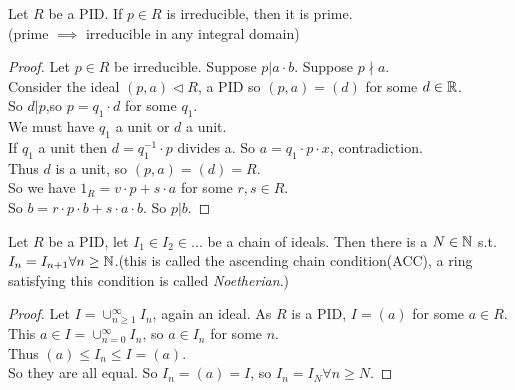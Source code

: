 \documentclass[a4paper]{article}
\begin{document}
\begin{lemma}
Let $R$ be a PID. If $p\in R$ is irreducible, then it is prime.\\
(prime $\implies$ irreducible in any integral domain)
\begin{proof}
Let $p\in R$ be irreducible. Suppose $p|a\cdot b$. Suppose $p \nmid a$.\\
Consider the ideal $\left(p,a\right)\triangleleft R$, a PID so $\left(p,a\right)=\left(d\right)$ for some $d\in \mathbb{R}$.\\
So $d|p$,so $p=q_{1}\cdot d$ for some $q_{1}$.\\
We must have $q_{1}$ a unit or $d$ a unit.\\
If $q_{1}$ a unit then $d=q_{1}^{-1}\cdot p$ divides a. So $a=q_{1}\cdot p\cdot x$, contradiction.\\
Thus $d$ is a unit, so $\left(p,a\right)=\left(d\right)=R$.\\
So we have $1_{R}=v\cdot p+s\cdot a$ for some $r,s \in R$.\\
So $b=r\cdot p\cdot b + s\cdot a\cdot b$. So $p|b$.
\end{proof}
\end{lemma}

\begin{lemma}
Let $R$ be a PID, let $I_{1}\in I_{2}\in...$ be a chain of ideals. Then there is a $N\in\mathbb{N}$ s.t. $I_{n}=I_{n+1} \forall n\geq \mathbb{N}$.(this is called the ascending chain condition(ACC), a ring satisfying this condition is called \emph{Noetherian}.)
\begin{proof}
Let $I=\cup_{n\geq 1}^\infty I_{n}$, again an ideal. As $R$ is a PID, $I=\left(a\right)$ for some $a\in R$. This $a\in I=\cup_{n=0}^\infty I_{n}$, so $a\in I_{n}$ for some $n$. \\
Thus $\left(a\right) \leq I_{n} \leq I = \left(a\right)$.\\
So they are all equal. So $I_{n}=\left(a\right)=I$, so $I_{n}=I_{N} \forall n \geq N$.
\end{proof}
\end{lemma}
\end{document}
